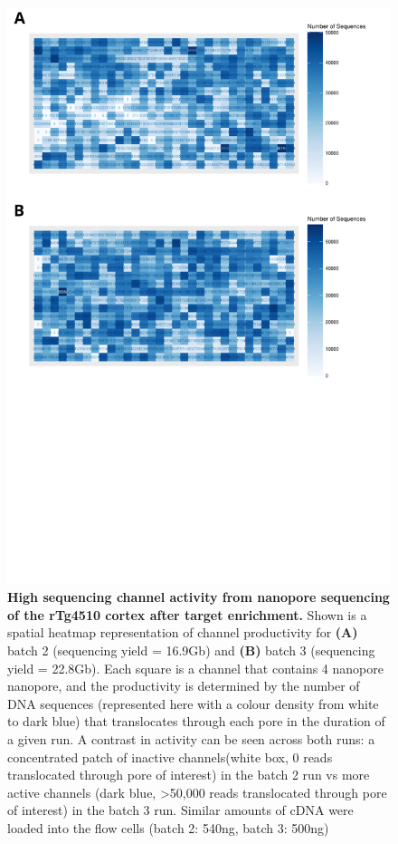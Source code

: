 \begin{figure}[htp]
	\begin{center}
		\includegraphics[page=1,trim={0 13cm 0 0},scale = 0.45]{Figures/ONTTargetedTranscriptome.pdf}
	\end{center}
	\captionsetup{width=0.95\textwidth}
	\caption[ONT sequencing channel activity for targeted profiling of the rTg4510 cortex]%
	{\textbf{High sequencing channel activity from nanopore sequencing of the rTg4510 cortex after target enrichment.} Shown is a spatial heatmap representation of channel productivity for \textbf{(A)} batch 2 (sequencing yield = 16.9Gb) and \textbf{(B)} batch 3 (sequencing yield = 22.8Gb). Each square is a channel that contains 4 nanopore nanopore, and the productivity is determined by the number of DNA sequences (represented here with a colour density from white to dark blue) that translocates through each pore in the duration of a given run. A contrast in activity can be seen across both runs: a concentrated patch of inactive channels(white box, 0 reads translocated through pore of interest) in the batch 2 run vs more active channels (dark blue, >50,000 reads translocated through pore of interest) in the batch 3 run. Similar amounts of cDNA were loaded into the flow cells (batch 2: 540ng, batch 3: 500ng)}
	\label{fig:ont_targetedseq_channel}
\end{figure}

